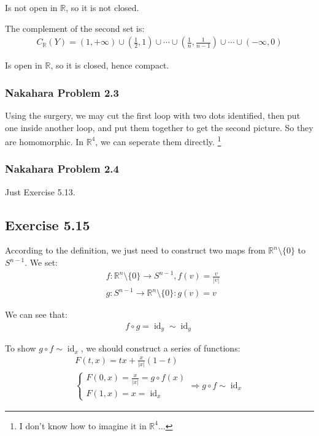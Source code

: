 \documentclass[]{ctexart}
\begin{document}
			Is not open in $\mathbb{R}$, so it is not closed. 
			
			The complement of the second set is:
				\begin{equation*}
				\begin{aligned}
					C_{\mathbb{R}}(Y)=(1,+\infty)\cup (\frac{1}{2},1)\cup \cdots \cup(\frac{1}{n},\frac{1}{n-1})\cup \cdots \cup(-\infty,0)
				\end{aligned}
				\end{equation*}
			
			Is open in $\mathbb{R}$, so it is closed, hence compact. 
		
		\subsubsection{Nakahara Problem 2.3}
			Using the surgery, we may cut the first loop with two dots identified, then put one inside another loop, and put them together to get the second picture. So they are homomorphic. In $\mathbb{R}^4$, we can seperate them directly. \footnote{I don't know how to imagine it in $\mathbb{R}^4$...}
		
		\subsubsection{Nakahara Problem 2.4}
			Just Exercise 5.13.  
	
	\subsection{Exercise 5.15}
		According to the definition, we just need to construct two maps from $\mathbb{R}^n\setminus \{0\}$ to $S^{n-1}$. We set:
			\begin{equation*}
			\begin{aligned}
				&f:\mathbb{R}^n\setminus \{0\}\rightarrow S^{n-1},f(v)=\frac{v}{|v|}\\
				&g:S^{n-1}\to \mathbb{R}^n\setminus \{0\}: g(v)=v
			\end{aligned}
			\end{equation*}
		
		We can see that:
			\begin{equation*}
			\begin{aligned}
				f\circ g=\operatorname{id}_y\sim \operatorname{id}_y
			\end{aligned}
			\end{equation*}
		
		To show $g\circ f\sim \operatorname{id}_x$, we should construct a series of functions:
			\begin{equation*}
			\begin{array}{c}
				F(t,x)=tx+\frac{x}{|x|}(1-t)\\
				\begin{cases}
					F(0,x)=\frac{x}{|x|}=g\circ f(x)\\
					F(1,x)=x=\operatorname{id}_x
				\end{cases}
				\Rightarrow g\circ f\sim \operatorname{id}_x
			\end{array}
			\end{equation*}
		
\end{document}
